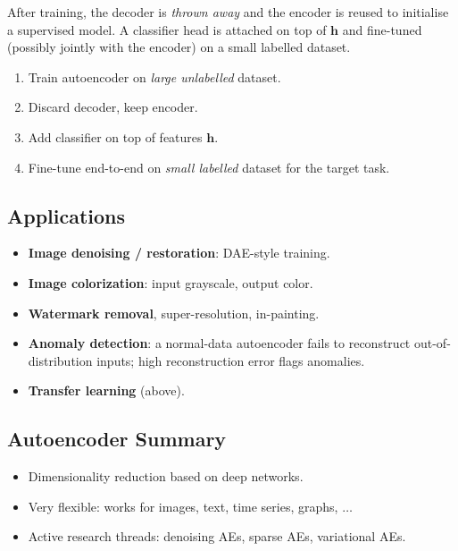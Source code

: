 \documentclass[11pt,a4paper]{article}
\theoremstyle{definition}
\theoremstyle{plain}
\theoremstyle{remark}
\begin{document}
After training, the decoder is \emph{thrown away} and the encoder is reused to initialise a supervised model. A classifier head is attached on top of $\mathbf{h}$ and fine-tuned (possibly jointly with the encoder) on a small labelled dataset.

\begin{tcolorbox}[colback=blue!5!white, colframe=blue!60!black, title={Transfer pipeline}]
\begin{enumerate}
    \item Train autoencoder on \emph{large unlabelled} dataset.
    \item Discard decoder, keep encoder.
    \item Add classifier on top of features $\mathbf{h}$.
    \item Fine-tune end-to-end on \emph{small labelled} dataset for the target task.
\end{enumerate}
\end{tcolorbox}

\subsection{Applications}

\begin{itemize}
    \item \textbf{Image denoising / restoration}: DAE-style training.
    \item \textbf{Image colorization}: input grayscale, output color.
    \item \textbf{Watermark removal}, super-resolution, in-painting.
    \item \textbf{Anomaly detection}: a normal-data autoencoder fails to reconstruct out-of-distribution inputs; high reconstruction error flags anomalies.
    \item \textbf{Transfer learning} (above).
\end{itemize}

\subsection{Autoencoder Summary}

\begin{itemize}
    \item Dimensionality reduction based on deep networks.
    \item Very flexible: works for images, text, time series, graphs, $\ldots$
    \item Active research threads: denoising AEs, sparse AEs, variational AEs.
\end{itemize}
\end{document}

